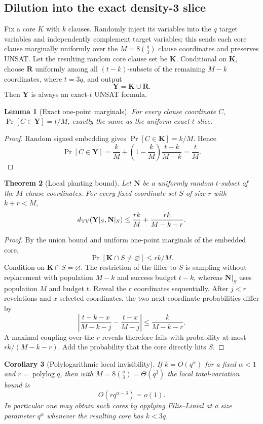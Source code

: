 \documentclass[11pt]{article}
\newtheorem{theorem}{Theorem}
\newtheorem{lemma}[theorem]{Lemma}
\newtheorem{corollary}[theorem]{Corollary}
\begin{document}
\subsection{Dilution into the exact density-3 slice}
Fix a core $K$ with $k$ clauses. Randomly inject its variables into the $q$ target variables and independently complement target variables; this sends each core clause marginally uniformly over the $M=8\binom q3$ clause coordinates and preserves UNSAT. Let the resulting random core clause set be $\mathbf K$. Conditional on $\mathbf K$, choose $\mathbf R$ uniformly among all $(t-k)$-subsets of the remaining $M-k$ coordinates, where $t=3q$, and output
\[\mathbf Y=\mathbf K\cup\mathbf R.\]
Then $\mathbf Y$ is always an exact-$t$ UNSAT formula.

\begin{lemma}[Exact one-point marginals]
For every clause coordinate $C$, $\Pr[C\in\mathbf Y]=t/M$, exactly the same as the uniform exact-$t$ slice.
\end{lemma}
\begin{proof}
Random signed embedding gives $\Pr[C\in\mathbf K]=k/M$. Hence
\[
\Pr[C\in\mathbf Y]=\frac{k}{M}+\left(1-\frac{k}{M}\right)\frac{t-k}{M-k}=\frac{t}{M}.
\]
\end{proof}

\begin{theorem}[Local planting bound]
Let $\mathbf N$ be a uniformly random $t$-subset of the $M$ clause coordinates. For every fixed coordinate set $S$ of size $r$ with $k+r<M$,
\[
d_{\rm TV}(\mathbf Y|_S,\mathbf N|_S)
\le \frac{rk}{M}+\frac{rk}{M-k-r}.
\]
\end{theorem}
\begin{proof}
By the union bound and uniform one-point marginals of the embedded core,
\[\Pr[\mathbf K\cap S\ne\varnothing]\le rk/M.\]
Condition on $\mathbf K\cap S=\varnothing$. The restriction of the filler to $S$ is sampling without replacement with population $M-k$ and success budget $t-k$, whereas $\mathbf N|_S$ uses population $M$ and budget $t$. Reveal the $r$ coordinates sequentially. After $j<r$ revelations and $x$ selected coordinates, the two next-coordinate probabilities differ by
\[
\left|\frac{t-k-x}{M-k-j}-\frac{t-x}{M-j}\right|
\le \frac{k}{M-k-r}.
\]
A maximal coupling over the $r$ reveals therefore fails with probability at most $rk/(M-k-r)$. Add the probability that the core directly hits $S$.
\end{proof}

\begin{corollary}[Polylogarithmic local invisibility]
If $k=O(q^\alpha)$ for a fixed $\alpha<1$ and $r=\operatorname{polylog}q$, then with $M=8\binom q3=\Theta(q^3)$ the local total-variation bound is
\[O(rq^{\alpha-3})=o(1).\]
In particular one may obtain such cores by applying Ellis--Linial at a size parameter $q^\alpha$ whenever the resulting core has $k<3q$.
\end{corollary}
\end{document}
